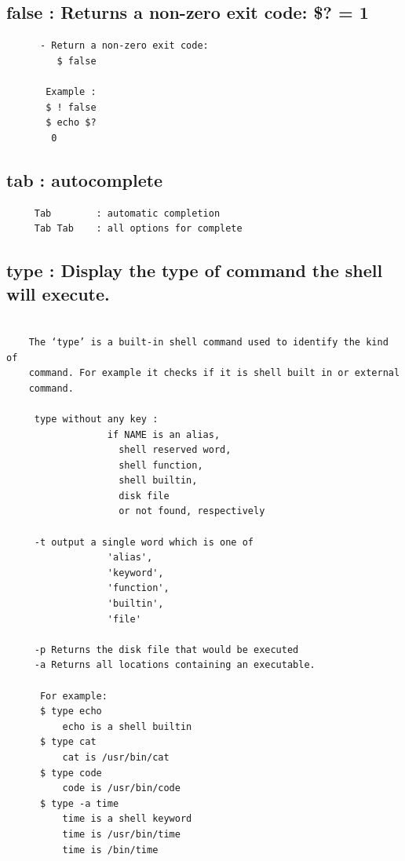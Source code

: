 \documentclass[a4paper,12pt]{article}
\begin{document}
\subsection{false     : Returns a non-zero exit code: \$? = 1}
\begin{verbatim}
      - Return a non-zero exit code:
         $ false
         
       Example : 
       $ ! false
       $ echo $?
        0   
\end{verbatim}


\subsection{tab     : autocomplete}
\begin{verbatim}
     Tab 		: automatic completion
     Tab Tab 	: all options for complete
\end{verbatim}










\subsection{type     : Display the type of command the shell will execute.}
\begin{verbatim}

    The ‘type’ is a built-in shell command used to identify the kind of
    command. For example it checks if it is shell built in or external 
    command. 
     
     type without any key : 
                  if NAME is an alias,
    		        shell reserved word, 
    		        shell function, 
    		        shell builtin, 
    		        disk file
    		        or not found, respectively
     	
     -t	output a single word which is one of 
                  'alias',
                  'keyword',
                  'function', 
                  'builtin',
                  'file'

     -p	Returns the disk file that would be executed
     -a	Returns all locations containing an executable.

      For example:
      $ type echo
          echo is a shell builtin
      $ type cat
          cat is /usr/bin/cat
      $ type code
          code is /usr/bin/code     
      $ type -a time
          time is a shell keyword
          time is /usr/bin/time
          time is /bin/time

\end{verbatim}
\end{document}
